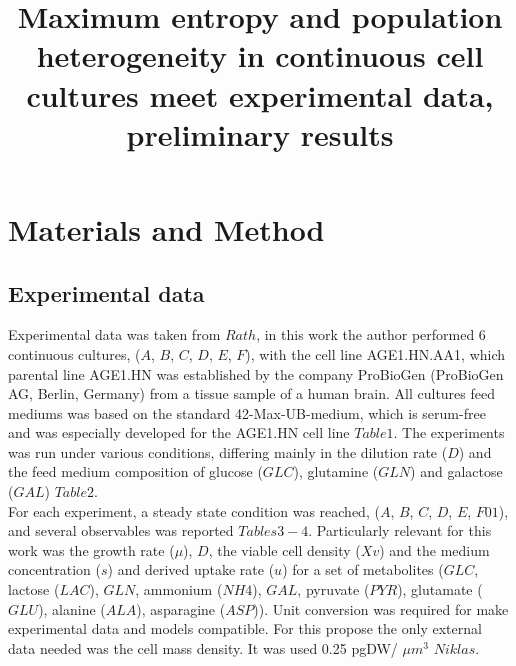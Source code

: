 \documentclass[]{article}
\title{Maximum entropy and population heterogeneity in continuous cell cultures meet experimental data, preliminary results}
\author{}
\begin{document}
\maketitle







\section{Materials and Method} %

\subsection{Experimental data} %
	  
	Experimental data was taken from $Rath$, in this work the author performed 6 continuous cultures, ($A$, $B$, $C$, $D$, $E$, $F$), with the cell line AGE1.HN.AA1, which parental line AGE1.HN was established by the company ProBioGen (ProBioGen AG, Berlin, Germany) from a tissue sample of a human brain. All cultures feed mediums was based on the standard 42-Max-UB-medium, which is serum-free and was especially developed for the AGE1.HN cell line $Table 1$. The experiments was run under various conditions, differing mainly in the dilution rate ($D$) and the feed medium composition of glucose ($GLC$), glutamine ($GLN$) and galactose ($GAL$) $Table 2$. \\
	For each experiment, a steady state condition was reached, ($A$, $B$, $C$, $D$, $E$, $F01$), and several observables  was reported $Tables 3-4$. Particularly relevant for this work was the growth rate ($\mu$), $D$, the viable cell density ($Xv$) and the medium concentration ($s$) and derived uptake rate ($u$) for a set of metabolites ($GLC$, lactose ($LAC$), $GLN$, ammonium ($NH4$), $GAL$, pyruvate ($PYR$), glutamate ($GLU$), alanine ($ALA$), asparagine ($ASP$)). Unit conversion was required for make experimental data and models compatible. For this propose the only external data needed was the cell mass density. It was used  0.25 pgDW/ $\mu$$m^3$ $Niklas$.
	 
\end{document}
